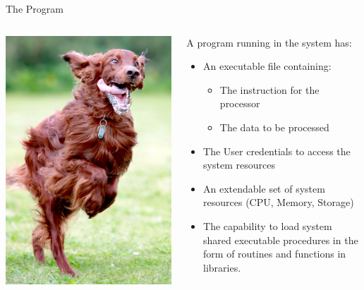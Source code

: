 \documentclass[unknownkeysallowed, 10pt, a4 paper, handout]{beamer}
\begin{document}
\begin{frame}[label=program]{The Program}
  \begin{columns}[T]
    \begin{column}{.23\textwidth}
      \includegraphics[scale=0.15]{pics/running.jpg}
    \end{column}
    \hfill
    \begin{column}{.73\textwidth}
      \small{
      A program running in the system has:
      \begin{itemize}
        \item An executable file containing:
        \begin{itemize}
          \item The instruction for the processor
          \item The data to be processed
        \end{itemize}
        \item The User credentials to access the system resources
        \item An extendable set of system resources (CPU, Memory, Storage)
        \item The capability to load system shared executable procedures
          in the form of routines and functions in libraries.
      \end{itemize}
    }
    \end{column}
  \end{columns}
\end{frame}
\end{document}
